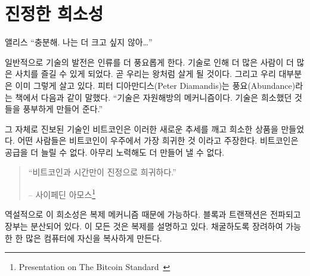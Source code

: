 
\chapter{진정한 희소성}
\label{les:2}

\begin{chapquote}{앨리스}
	\enquote{충분해. 나는 더 크고 싶지 않아\ldots}
\end{chapquote}


일반적으로 기술의 발전은 인류를 더 풍요롭게 한다. 기술로 인해 더 많은 사람이 더 많은 사치를 즐길 수 있게 되었다.
곧 우리는 왕처럼 살게 될 것이다. 그리고 우리 대부분은 이미 그렇게 살고 있다.
피터 디아만디스(Peter Diamandis)는 풍요(Abundance)라는 책에서 다음과 같이 말했다\cite{abundance}. \enquote{기술은 자원해방의 메커니즘이다.
	기술은 희소했던 것들을 풍부하게 만들어 준다.}

그 자체로 진보된 기술인 비트코인은 이러한 새로운 추세를 깨고 희소한 상품을 만들었다. 
어떤 사람들은 비트코인이 우주에서 가장 희귀한 것 이라고 주장한다.
비트코인은 공급을 더 늘릴 수 없다. 아무리 노력해도 더 만들어 낼 수 없다.

\begin{quotation}\begin{samepage}
		\enquote{비트코인과 시간만이 진정으로 희귀하다.}
		\begin{flushright} -- 사이페딘 아모스\footnote{Presentation on The Bitcoin Standard~\cite{bitcoinstandard-pres}}
\end{flushright}\end{samepage}\end{quotation}

역설적으로 이 희소성은 복제 메커니즘 때문에 가능하다. 
블록과 트랜잭션은 전파되고 장부는 분산되어 있다. 
이 모든 것은 복제를 설명하고 있다. 
채굴하도록 장려하여 
가능한 한 많은 컴퓨터에 자신을 복사하게 만든다.

